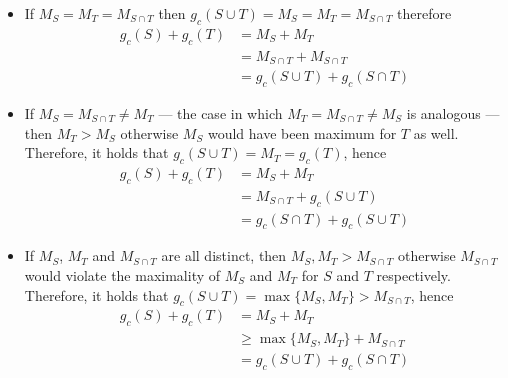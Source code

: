 \documentclass[a4paper, 12pt]{report}
\begin{document}
{{\begin{itemize}
                    \begin{itemize}
                        \item If $M_S = M_T = M_{S \cap T}$ then $g_c(S \cup T) = M_S = M_T = M_{S \cap T}$ therefore
                            \begin{equation*}
                                \begin{split}
                                    g_c(S) + g_c(T) &= M_S + M_T \\
                                                    &= M_{S \cap T} + M_{S \cap T} \\
                                                    &= g_c(S \cup T) + g_c(S \cap T)
                                \end{split}
                            \end{equation*}
                        \item If $M_S = M_{S \cap T} \neq M_T$ --- the case in which $M_T = M_{S \cap T} \neq M_S$ is analogous --- then $M_T > M_S$ otherwise $M_S$ would have been maximum for $T$ as well. Therefore, it holds that $g_c(S \cup T) = M_T = g_c(T)$, hence
                            \begin{equation*}
                                \begin{split}
                                    g_c(S) + g_c(T) &= M_S + M_T \\
                                                    &= M_{S \cap T} + g_c(S \cup T) \\
                                                    &= g_c(S \cap T) + g_c(S \cup T)
                                \end{split}
                            \end{equation*}
                        \item If $M_S$, $M_T$ and $M_{S \cap T}$ are all distinct, then $M_S, M_T > M_{S \cap T}$ otherwise $M_{S \cap T}$ would violate the maximality of $M_S$ and $M_T$ for $S$ and $T$ respectively. Therefore, it holds that $g_c(S \cup T) = \max\{M_S, M_T\} > M_{S \cap T}$, hence
                            \begin{equation*}
                                \begin{split}
                                    g_c(S) + g_c(T) &= M_S + M_T \\
                                                    &\ge \max \{M_S, M_T\} + M_{S \cap T} \\
                                                    &= g_c(S \cup T) + g_c(S \cap T)
                                \end{split}
                            \end{equation*}
                    \end{itemize}
            \end{itemize}
        }

}
\end{document}
